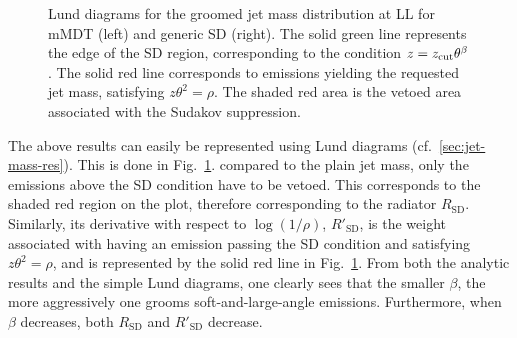 \begin{figure}[t!]
    \centering
  \qquad
  \caption{Lund diagrams for the groomed jet mass distribution at LL
    for mMDT (left) and generic SD (right). The solid green line
    represents the edge of the SD region, corresponding to the
    condition $z=z_{\text{cut}}\theta^\beta$. The solid red line corresponds to
    emissions yielding the requested jet mass, \ie satisfying
    $z\theta^2=\rho$. The shaded red area is the vetoed area
    associated with the Sudakov suppression.}\label{fig:lund-sd-mmdt}
\end{figure}

The above results can easily be represented using Lund diagrams
(cf.~\ref{sec:jet-mass-res}). This is done in
Fig.~\ref{fig:lund-sd-mmdt}. compared to the plain jet mass, only the
emissions above the SD condition have to be vetoed.
%
This corresponds to the shaded red region on the plot, therefore
corresponding to the radiator $R_{\text{SD}}$.
%
Similarly, its derivative with respect to $\log(1/\rho)$, $R'_{\text{SD}}$,
is the weight associated with having an emission passing the SD
condition and satisfying $z\theta^2=\rho$, and is represented by the
solid red line in Fig.~\ref{fig:lund-sd-mmdt}.
%
From both the analytic results and the simple Lund diagrams, one
clearly sees that the smaller $\beta$, the more aggressively one
grooms soft-and-large-angle emissions. Furthermore, when $\beta$ decreases,
both $R_{\text{SD}}$ and $R'_{\text{SD}}$ decrease.



